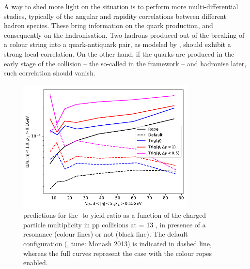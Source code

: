 A way to shed more light on the situation is to perform more multi-differential studies, typically of the angular and rapidity correlations between different hadron species. These bring information on the quark production, and consequently on the hadronisation. Two hadrons produced out of the breaking of a colour string into a quark-antiquark pair, as modeled by \Pythia, should exhibit a strong local correlation. On the other hand, if the quarks are produced in the early stage of the collision -- the so-called  in the \Epos framework \cite{wernerCorecoronaProcedureMicrocanonical2023} -- and hadronise later, such correlation should vanish.

\begin{figure}[t]
\centering
\includegraphics[width=0.8\textwidth]{Figs/Chapter6/PredictionPythia_Bierlich.png}
\caption{\Pythiaeight predictions for the \rmOmega-to-\rmPiPM yield ratio as a function of the charged particle multiplicity in pp collisions at \sqrtS =  13 \tev, in presence of a \rmPhiMes resonance (colour lines) or not (black line). The default \Pythia configuration (\Pythiaeight, tune: Monash 2013) is indicated in dashed line, whereas the full curves represent the case with the colour ropes enabled.}
	\label{fig:PredictionPythia_Bierlich}
\end{figure}


